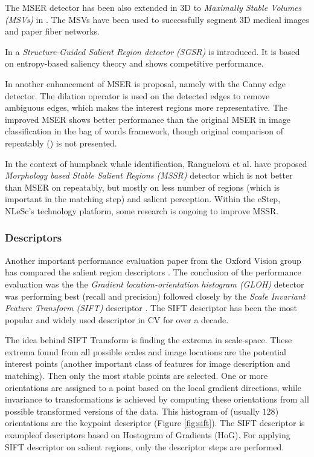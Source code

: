 The MSER detector has been also extended in 3D to {\em Maximally Stable Volumes (MSVs)} in \cite{DonoserB06}. The MSVs have been used to successfully segment 3D medical images and paper fiber networks.

In \cite{Fan08} a {\em Structure-Guided Salient Region detector (SGSR)} is introduced. It is based on entropy-based saliency theory and shows competitive performance.

In \cite{Wang14} another enhancement of MSER is proposal, namely with the Canny edge detector. The dilation operator is used on the detected edges to remove ambiguous edges, which makes the interest regions more representative. The improved MSER shows better performance than the original MSER in image classification in the bag of words framework, though original comparison of repeatably (\cite{Mikolajczyk:2005}) is not presented. 

In the context of humpback whale identification, Ranguelova et al. \cite{RangMSSR06, RangHumpb06} have proposed {\em Morphology based Stable Salient Regions (MSSR) } detector which is not better than MSER on repeatably, but mostly on less number of regions (which is important in the matching step) and salient perception. Within the eStep, NLeSc's technology platform, some research is ongoing to improve MSSR.

\subsubsection{Descriptors}
Another important performance evaluation paper from the Oxford Vision group has compared the salient region descriptors \cite{MS05}. The conclusion of the performance evaluation was the the {\em Gradient location-orientation histogram (GLOH)} detector was performing best (recall and precision) followed closely by the {\em Scale Invariant Feature Transform (SIFT)} descriptor \cite{Lowe:2004}. The SIFT descriptor has been the most popular and widely used descriptor in CV for over a decade. 

The idea behind SIFT Transform is finding the extrema in scale-space. These extrema found from all possible scales and image locations are the potential interest points (another important class of features for image description and matching). Then only the most stable points are selected. One or more orientations are assigned to a point based on the local gradient directions, while invariance to transformations is achieved by computing these orientations from all possible transformed versions of the data.  This histogram of (usually $128$) orientations are the keypoint descriptor (Figure \ref{fig:sift}). The SIFT descriptor is exampleof descriptors based on Hostogram of Gradients (HoG). For applying SIFT descriptor on salient regions, only the descriptor steps are performed. 

